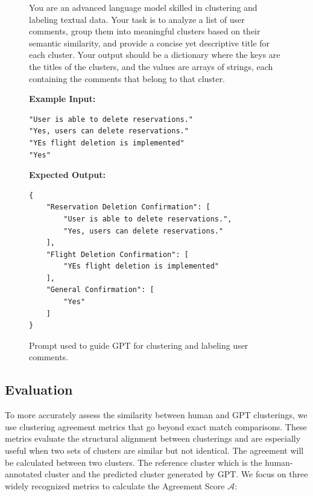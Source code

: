 \documentclass[manuscript,review, anonymous]{acmart}
\begin{document}
\begin{figure}[t]
\centering
\begin{tcolorbox}[title=Clustering Prompt for GPT, colback=gray!5, colframe=black, width=\linewidth]
You are an advanced language model skilled in clustering and labeling textual data. Your task is to analyze a list of user comments, group them into meaningful clusters based on their semantic similarity, and provide a concise yet descriptive title for each cluster. Your output should be a dictionary where the keys are the titles of the clusters, and the values are arrays of strings, each containing the comments that belong to that cluster.

\textbf{Example Input:}
\begin{lstlisting}[style=feedbacklist, caption={}, label={}]
"User is able to delete reservations."
"Yes, users can delete reservations."
"YEs flight deletion is implemented"
"Yes"
\end{lstlisting}

\textbf{Expected Output:}
\begin{lstlisting}[basicstyle=\ttfamily\small, frame=single, breaklines=true]
{
    "Reservation Deletion Confirmation": [
        "User is able to delete reservations.",
        "Yes, users can delete reservations."
    ],
    "Flight Deletion Confirmation": [
        "YEs flight deletion is implemented"
    ],
    "General Confirmation": [
        "Yes"
    ]
}
\end{lstlisting}
\end{tcolorbox}
\caption{Prompt used to guide GPT for clustering and labeling user comments.}
\label{fig:gpt_prompt}
\end{figure}




\subsection{Evaluation}

To more accurately assess the similarity between human and GPT clusterings, we use clustering agreement metrics that go beyond exact match comparisons. These metrics evaluate the structural alignment between clusterings and are especially useful when two sets of clusters are similar but not identical. The agreement will be calculated between two clusters. The reference cluster which is the human-annotated cluster and the predicted cluster generated by GPT. We focus on three widely recognized metrics to calculate the Agreement Score $\mathcal{A}$:
\end{document}
